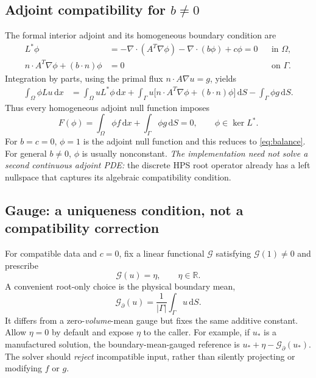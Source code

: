 \documentclass[11pt,letterpaper]{article}
\newcommand{\Om}{\Omega}
\newcommand{\Gm}{\Gamma}
\newcommand{\dd}{\,\mathrm d}
\newcommand{\RR}{\mathbb R}
\newcommand{\Ker}{\operatorname{ker}}
\begin{document}
\subsection{Adjoint compatibility for $b\ne0$}
The formal interior adjoint and its homogeneous boundary condition are
\begin{equation}\label{eq:adjoint}
 \begin{aligned}
 L^*\phi&=-\nabla\cdot(A^T\nabla\phi)
               -\nabla\cdot(b\phi)+c\phi=0
               &&\text{in }\Om,\\
 n\cdot A^T\nabla\phi+(b\cdot n)\phi&=0
               &&\text{on }\Gm.
 \end{aligned}
\end{equation}
Integration by parts, using the primal flux $n\cdot A\nabla u=g$, yields
\begin{align}\label{eq:green}
 \int_\Om\phi Lu\dd x
 &=\int_\Om uL^*\phi\dd x
   +\int_\Gm u\bigl[n\cdot A^T\nabla\phi
                         +(b\cdot n)\phi\bigr]\dd S
   -\int_\Gm\phi g\dd S.
\end{align}
Thus every homogeneous adjoint null function imposes
\begin{equation}\label{eq:adjcompat}
 \boxed{F(\phi)=\int_\Om\phi f\dd x
                 +\int_\Gm\phi g\dd S=0,
       \qquad \phi\in\Ker L^*.}
\end{equation}
For $b=c=0$, $\phi=1$ is the adjoint null function and this reduces to
\eqref{eq:balance}. For general $b\ne0$, $\phi$ is usually nonconstant.
\emph{The implementation need not solve a second continuous adjoint PDE:}
the discrete HPS root operator already has a left nullspace that captures its
algebraic compatibility condition.

\subsection{Gauge: a uniqueness condition, not a compatibility correction}
For compatible data and $c=0$, fix a linear functional $\mathcal G$ satisfying
$\mathcal G(1)\ne0$ and prescribe
\begin{equation}\label{eq:gauge}
 \boxed{\mathcal G(u)=\eta,\qquad \eta\in\RR.}
\end{equation}
A convenient root-only choice is the physical boundary mean,
\begin{equation}\label{eq:boundarymean}
 \mathcal G_\partial(u)=\frac{1}{|\Gm|}
       \int_\Gm u\dd S.
\end{equation}
It differs from a zero-\emph{volume}-mean gauge but fixes the same additive
constant. Allow $\eta=0$ by default and expose $\eta$ to the caller.
For example, if $u_*$ is a manufactured solution, the boundary-mean-gauged
reference is $u_*+\eta-\mathcal G_\partial(u_*)$.
The solver should \emph{reject} incompatible input, rather than silently
projecting or modifying $f$ or $g$.
\end{document}
